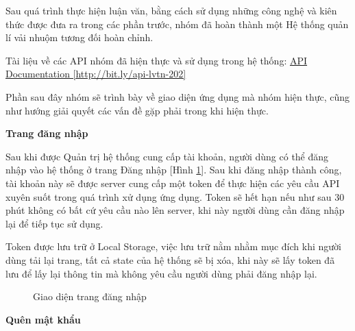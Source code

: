 Sau quá trình thực hiện luận văn, bằng cách sử dụng những công nghệ và kiên thức được đưa ra trong các phần trước, nhóm đã hoàn thành một Hệ thống quản lí vải nhuộm tương đối hoàn chỉnh.\par

Tài liệu về các API nhóm đã hiện thực và sử dụng trong hệ thống: \href{http://bit.ly/api-lvtn-202}{API Documentation [http://bit.ly/api-lvtn-202]}

Phần sau đây nhóm sẽ trình bày về giao diện ứng dụng mà nhóm hiện thực, cũng như hướng giải quyết các vấn đề gặp phải trong khi hiện thực.

\textbf{Trang đăng nhập}

Sau khi được Quản trị hệ thống cung cấp tài khoản, người dùng có thể đăng nhập vào hệ thống ở trang Đăng nhập [Hình \ref{result_dang_nhap}]. Sau khi đăng nhập thành công, tài khoản này sẽ được server cung cấp một token để thực hiện các yêu cầu API xuyên suốt trong quá trình xử dụng ứng dụng. Token sẽ hết hạn nếu như sau 30 phút không có bất cứ yêu cầu nào lên server, khi này người dùng cần đăng nhập lại để tiếp tục sử dụng.\par
Token được lưu trữ ở Local Storage, việc lưu trữ nằm nhằm mục đích khi người dùng tải lại trang, tất cả state của hệ thống sẽ bị xóa, khi này sẽ lấy token đã lưu để lấy lại thông tin mà không yêu cầu người dùng phải đăng nhập lại.
\begin{figure}[H]
    \begin{center}
        \caption{Giao diện trang đăng nhập}
        \label{result_dang_nhap}
    \end{center}
\end{figure}

\textbf{Quên mật khẩu}

